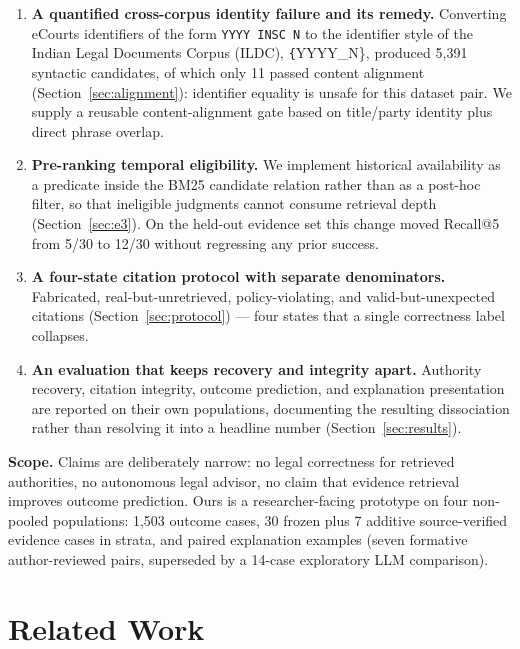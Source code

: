 \documentclass[conference]{IEEEtran}
\begin{document}
\begin{enumerate}
\item \textbf{A quantified cross-corpus identity failure and its remedy.}
Converting eCourts identifiers of the form \texttt{YYYY INSC N} to the identifier style of the Indian Legal Documents Corpus (ILDC), \texttt\{YYYY\_N\}, produced 5{,}391 syntactic candidates, of which only 11 passed
content alignment (Section~\ref{sec:alignment}): identifier
equality is unsafe for this dataset pair. We supply a reusable
content-alignment gate based on title/party identity plus direct phrase overlap.

\item \textbf{Pre-ranking temporal eligibility.} We implement historical
availability as a predicate inside the BM25 candidate relation rather than as a
post-hoc filter, so that ineligible judgments cannot consume retrieval depth
(Section~\ref{sec:e3}). On the held-out evidence set this change moved
Recall@5 from 5/30 to 12/30 without regressing any prior success.

\item \textbf{A four-state citation protocol with separate denominators.}
Fabricated, real-but-unretrieved, policy-violating, and valid-but-unexpected
citations (Section~\ref{sec:protocol}) --- four states that a single
correctness label collapses.

\item \textbf{An evaluation that keeps recovery and integrity apart.} Authority
recovery, citation integrity, outcome prediction, and explanation
presentation are reported on their own populations, documenting the resulting
dissociation rather than resolving it into a headline number (Section~\ref{sec:results}).
\end{enumerate}

\textbf{Scope.} Claims are deliberately narrow: no legal
correctness for retrieved authorities, no autonomous legal advisor, no
claim that evidence retrieval improves outcome prediction. Ours is a
researcher-facing prototype on four non-pooled
populations: 1{,}503 outcome cases, 30 frozen plus 7 additive source-verified
evidence cases in strata, and paired explanation examples (seven
formative author-reviewed pairs, superseded by a 14-case exploratory LLM
comparison).

\section{Related Work}
\end{document}

